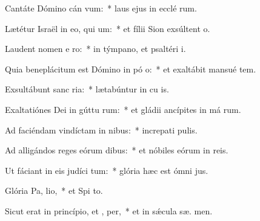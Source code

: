\item Cantáte Dómino cán vum:~* laus ejus in ecclé rum.
\item Lætétur Israël in eo, qui  um:~* et fílii Sion exsúltent   o.
\item Laudent nomen e  ro:~* in týmpano, et psaltéri  i.
\item Quia beneplácitum est Dómino in pó o:~* et exaltábit mansué  tem.
\item Exsultábunt sanc  ria:~* lætabúntur in cu is.
\item Exaltatiónes Dei in gúttu rum:~* et gládii ancípites in má rum.
\item Ad faciéndam vindíctam in nibus:~* increpati  pulis.
\item Ad alligándos reges eórum  dibus:~* et nóbiles eórum in  reis.
\item Ut fáciant in eis judíci tum:~* glória hæc est ómni  jus.
\item Glória Pa,  lio,~* et Spi to.
\item Sicut erat in princípio, et ,  per,~* et in sǽcula sæ. men.
